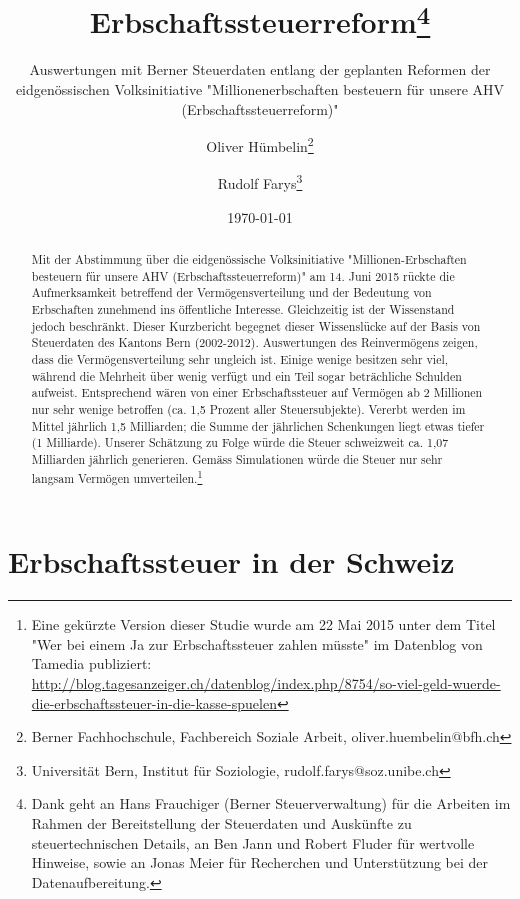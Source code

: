 \documentclass[a4paper, 12pt,liststotoc]{scrartcl}
\numberwithin{equation}{section}
\begin{document}
\title{Erbschaftssteuerreform\thanks{Dank geht an Hans Frauchiger (Berner
  Steuerverwaltung) für die Arbeiten im Rahmen der Bereitstellung der Steuerdaten und Auskünfte zu steuertechnischen Details, an Ben Jann und
  Robert Fluder für wertvolle Hinweise, sowie an Jonas Meier für
  Recherchen und Unterstützung bei der Datenaufbereitung.}}
\subtitle{Auswertungen mit Berner Steuerdaten entlang der geplanten Reformen der eidgenössischen Volksinitiative "Millionenerbschaften besteuern für unsere AHV (Erbschaftssteuerreform)"}
\author{Oliver Hümbelin\thanks{Berner Fachhochschule, Fachbereich Soziale Arbeit, oliver.huembelin@bfh.ch} \and Rudolf Farys\thanks{Universität Bern, Institut für Soziologie, rudolf.farys@soz.unibe.ch}}
\date{\today}
\maketitle
\newpage

\begin{abstract}
Mit der Abstimmung über die eidgenössische Volksinitiative "Millionen-Erbschaften besteuern für unsere AHV (Erbschaftssteuerreform)" am 14. Juni 2015 rückte die Aufmerksamkeit betreffend der Vermögensverteilung und der Bedeutung von Erbschaften zunehmend ins öffentliche Interesse. Gleichzeitig ist der Wissenstand jedoch beschränkt. Dieser Kurzbericht begegnet dieser Wissenslücke auf der Basis von Steuerdaten des Kantons Bern (2002-2012). Auswertungen des Reinvermögens zeigen, dass die Vermögensverteilung sehr ungleich ist. Einige wenige besitzen sehr viel, während die Mehrheit über wenig verfügt und ein Teil sogar beträchliche Schulden aufweist. Entsprechend wären von einer Erbschaftssteuer auf Vermögen ab 2 Millionen nur sehr wenige betroffen (ca. 1,5 Prozent aller Steuersubjekte). Vererbt werden im Mittel jährlich 1,5 Milliarden; die Summe der jährlichen Schenkungen liegt etwas tiefer (1 Milliarde). Unserer Schätzung zu Folge würde die Steuer schweizweit ca. 1,07 Milliarden jährlich generieren. Gemäss Simulationen würde die Steuer nur sehr langsam Vermögen umverteilen.\footnote{Eine gekürzte Version dieser Studie wurde am 22 Mai 2015 unter dem Titel "Wer bei einem Ja zur Erb\-schafts\-steu\-er zahlen müsste" im Da\-ten\-blog von Ta\-me\-dia publiziert: \url{http://blog.tagesanzeiger.ch/datenblog/index.php/8754/so-viel-geld-wuerde-die-erbschaftssteuer-in-die-kasse-spuelen}}
\end{abstract}
\newpage

\tableofcontents
\newpage

\section{Erbschaftssteuer in der
Schweiz}\label{erbschaftssteuer-in-der-schweiz}
\end{document}

